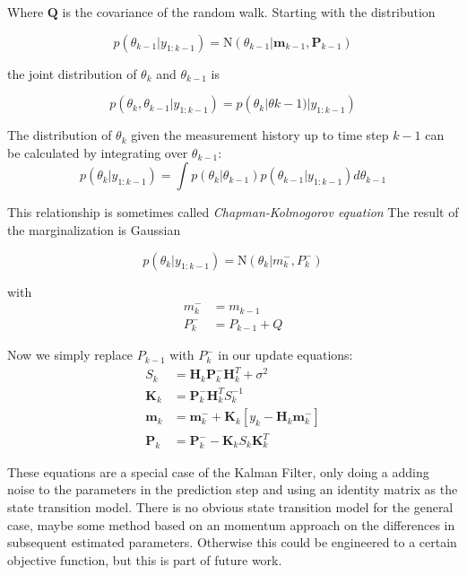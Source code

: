 Where $\mathbf{Q}$ is the covariance of the random walk. 
Starting with the distribution

$$ p(\theta_{k-1} | y_{1:k-1})
= \text{N}(\theta_{k-1} | \mathbf{m}_{k-1}, \mathbf{P}_{k-1}) $$

the joint distribution of $\theta_k$ and $\theta_{k-1}$ is

$$ p(\theta_k, \theta_{k-1} | y_{1:k-1})
= p(\theta_k | \theta{k-1}) | y_{1:k-1})
$$

The distribution of $\theta_k$ given the measurement history up to time
step $k - 1$ can be calculated by integrating over
$\theta_{k-1}$:
$$ p(\theta_k | y_{1:k-1})
= \int p(\theta_k | \theta_{k-1}) p(\theta_{k-1} | y_{1:k-1}) d\theta_{k-1}
$$

This relationship is sometimes called \textit{Chapman-Kolmogorov equation}
The result of the marginalization is Gaussian

$$ p(\theta_k | y_{1:k-1}) = \text{N}(\theta_k | m_k^{-}, P_k^{-}) $$

with
\begin{align}
  m_k^{-} &= m_{k-1} \\
  P_k^{-} &= P_{k-1} + Q
\end{align}

Now we simply replace $P_{k-1}$ with $P_k^{-}$ in our update equations:
\begin{align*}
     S_k &= \textbf{H}_k \textbf{P}_{k}^{-} \textbf{H}^T_k + \sigma^2 \\
     \textbf{K}_k &= \textbf{P}_{k}^{-} \textbf{H}^T_k S_k^{-1} \\
     \textbf{m}_k &= \textbf{m}_{k}^{-} + \textbf{K}_k [y_k - \textbf{H}_k \textbf{m}_{k}^{-}] \\
     \textbf{P}_k &= \textbf{P}_{k}^{-} - \textbf{K}_k S_k \textbf{K}_k^T
\end{align*}


These equations are a special case of the Kalman Filter, only doing
a adding noise to the parameters in the prediction step and using
an identity matrix as the state transition model. There is no
obvious state transition model for the general case, maybe some
method based on an momentum approach on the differences in subsequent
estimated parameters. Otherwise this could be engineered to a certain
objective function, but this is part of future work.